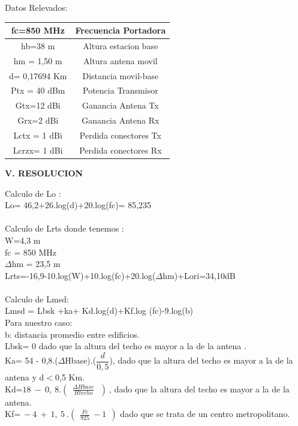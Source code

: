 \documentclass[conference, 9pt, a4paper]{IEEEtran}
\begin{document}
\begin{flushleft}
Datos Relevados:\\
\end{flushleft}

\begin{center}
\begin{tabular}{|c|c|}
\hline 
fc=850 MHz & Frecuencia Portadora  \\ 
\hline 
hb=38 m & Altura estacion base  \\ 
\hline 
hm = 1,50 m & Altura antena movil \\ 
\hline 
d= 0,17694 Km & Distancia movil-base \\ 
\hline 
Ptx = 40 dBm & Potencia Transmisor \\ 
\hline 
Gtx=12 dBi & Ganancia Antena Tx \\ 
\hline 
Grx=2 dBi & Ganancia Antena Rx \\ 
\hline 
Lctx = 1 dBi & Perdida conectores Tx \\ 
\hline 
Lcrzx= 1 dBi & Perdida conectores Rx \\ 
\hline 
\end{tabular} 
\end{center}

\begin{center}
\textbf{V. RESOLUCION }
\end{center}
Calculo de Lo :\\
Lo= 46,2+26.log(d)+20.log(fc)= 85,235\\\\
Calculo de Lrts donde tenemos :\\
W=4,3 m\\
fc = 850 MHz\\
$\Delta $hm = 23,5 m\\
Lrts=-16,9-10.log(W)+10.log(fc)+20.log($\Delta$hm)+Lori=34,10dB\\
\\
Calculo de Lmsd:\\
Lmsd = Lbsk +ka+ Kd.log(d)+Kf.log (fc)-9.log(b)\\
Para nuestro caso:\\
b:  distancia promedio entre edificios.\\
Lbsk= 0 dado que la altura del techo es mayor a la de la antena .\\
Ka= 54 - 0,8.($\Delta$Hbase).($\dfrac{d}{0,5}$), dado que la altura del techo es  mayor a la de la antena y d$<$0,5 Km.\\
Kd=$ 18\ -\ 0,\ 8.\left( \ \ \frac{\Delta Hbase}{Htecho} \ \ \ \right)\ $,  dado que la altura del techo es mayor a la de la antena.\\
Kf=$\ -4\ +\ 1,\ 5\ .\left( \ \ \frac{Fc}{925} \ -1\ \ \right)$ dado que se trata de un centro metropolitano.\\
\end{document}
